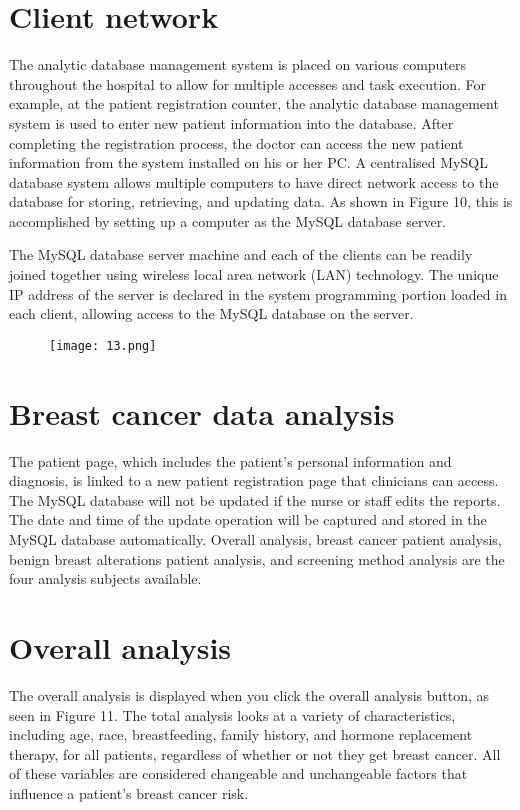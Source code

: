 \documentclass[10pt,a4paper,twoside]{article}
\begin{document}
\section{Client network}
The analytic database management system is placed on various computers throughout the hospital to allow for multiple accesses and task execution. For example, at the patient registration counter, the analytic database management system is used to enter new patient information into the database. After completing the registration process, the doctor can access the new patient information from the system installed on his or her PC. A centralised MySQL database system allows multiple computers to have direct network access to the database for storing, retrieving, and updating data.
As shown in Figure 10, this is accomplished by setting up a computer as the MySQL database server.

\vspace{0.3cm}

The MySQL database server machine and each of the clients can be readily joined together using wireless local area network (LAN) technology. The unique IP address of the server is declared in the system programming portion loaded in each client, allowing access to the MySQL database on the server.

\begin{figure}
  \texttt{[image: 13.png]}
  
  
  
\end{figure}

\section{Breast cancer data analysis}

The patient page, which includes the patient's personal information and diagnosis, is linked to a new patient registration page that clinicians can access. The MySQL database will not be updated if the nurse or staff edits the reports. The date and time of the update operation will be captured and stored in the MySQL database automatically. Overall analysis, breast cancer patient analysis, benign breast alterations patient analysis, and screening method analysis are the four analysis subjects available.

\section{Overall analysis}
The overall analysis is displayed when you click the overall analysis button, as seen in Figure 11.
The total analysis looks at a variety of characteristics, including age, race, breastfeeding, family history, and hormone replacement therapy, for all patients, regardless of whether or not they get breast cancer.
All of these variables are considered changeable and unchangeable factors that influence a patient's breast cancer risk.
\end{document}
